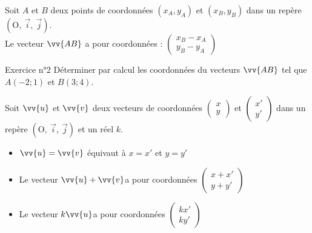 \documentclass[12pt,a4paper]{article}
\def\Oij{$\left(\text{O},~\vec{i},~\vec{j}\right)$}
\begin{document}
\begin{framed}
\vspace{3cm}
\end{framed}

\begin{pro}
Soit $A$ et $B$ deux points de coordonnées $(x_A,y_A)$ et $(x_B,y_B)$ dans un repère \Oij{}.\\
Le vecteur $\vv{AB}$ a pour coordonnées :
$\begin{pmatrix} 
      x_B-x_A\\ 
      y_B-y_A 
    \end{pmatrix}$
\end{pro}

\begin{mybox}{Exercice n°2}
Déterminer par calcul les coordonnées du vecteurs $\vv{AB}$ tel que $A(-2; 1)$ et $B(3; 4)$.

\end{mybox}

\begin{framed}
\vspace{3cm}
\end{framed}




\begin{pro}
Soit $\vv{u}$ et $\vv{v}$ deux vecteurs de coordonnées 
$\begin{pmatrix} 
      x\\ 
      y
\end{pmatrix}$
et 
$\begin{pmatrix} 
      x'\\ 
      y'
\end{pmatrix}$
dans un repère \Oij{} et un réel $k$.
\begin{itemize}
    \item $\vv{u}=\vv{v}$ équivaut à $x=x'$ et $y=y'$
    \item Le vecteur $\vv{u}+\vv{v}$a pour coordonnées 
    $\begin{pmatrix} 
      x+x'\\ 
      y+y'
\end{pmatrix}$
\item Le vecteur $k\vv{u}$a pour coordonnées
 $\begin{pmatrix} 
      kx'\\ 
      ky'
\end{pmatrix}$
\end{itemize}
\end{pro}
\end{document}
